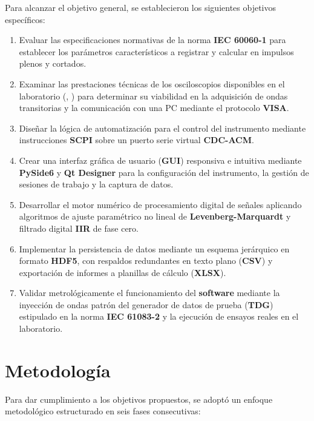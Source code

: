 Para alcanzar el objetivo general, se establecieron los siguientes objetivos específicos:

\begin{enumerate}
    \item Evaluar las especificaciones normativas de la norma \textbf{IEC 60060-1} \cite{iec60060_1} para establecer los parámetros característicos a registrar y calcular en impulsos plenos y cortados.
    \item Examinar las prestaciones técnicas de los osciloscopios disponibles en el laboratorio (\cite{gds1000au_ProgrammingManual}, \cite{gds1000au_driver}) para determinar su viabilidad en la adquisición de ondas transitorias y la comunicación con una PC mediante el protocolo \textbf{VISA}.
    \item Diseñar la lógica de automatización para el control del instrumento mediante instrucciones \textbf{SCPI} sobre un puerto serie virtual \textbf{CDC-ACM}.
    \item Crear una interfaz gráfica de usuario (\textbf{GUI}) responsiva e intuitiva mediante \textbf{PySide6} y \textbf{Qt Designer} para la configuración del instrumento, la gestión de sesiones de trabajo y la captura de datos.
    \item Desarrollar el motor numérico de procesamiento digital de señales aplicando algoritmos de ajuste paramétrico no lineal de \textbf{Levenberg-Marquardt} y filtrado digital \textbf{IIR} de fase cero.
    \item Implementar la persistencia de datos mediante un esquema jerárquico en formato \textbf{HDF5}, con respaldos redundantes en texto plano (\textbf{CSV}) y exportación de informes a planillas de cálculo (\textbf{XLSX}).
    \item Validar metrológicamente el funcionamiento del \textbf{software} mediante la inyección de ondas patrón del generador de datos de prueba (\textbf{TDG}) estipulado en la norma \textbf{IEC 61083-2} \cite{iec61083_2} y la ejecución de ensayos reales en el laboratorio.
\end{enumerate}

\section{Metodología} \label{sec:metodologia}

Para dar cumplimiento a los objetivos propuestos, se adoptó un enfoque metodológico estructurado en seis fases consecutivas:

